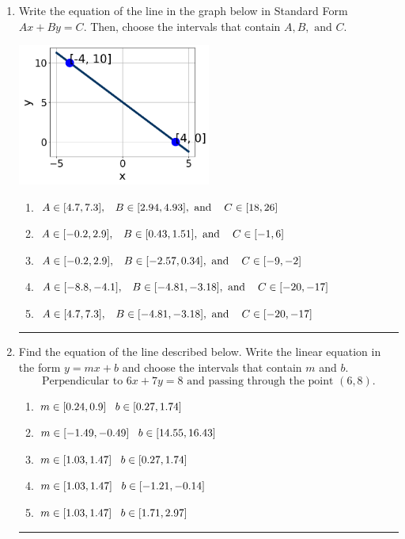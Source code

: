 \documentclass[14pt]{extbook}
\newcommand{\litem}[1]{\item#1\hspace*{-1cm}\rule{\textwidth}{0.4pt}}
\begin{document}
\begin{enumerate}
{\begin{enumerate}[label=\Alph*.]
\end{enumerate} }
\litem{
Write the equation of the line in the graph below in Standard Form $Ax+By=C$. Then, choose the intervals that contain $A, B, \text{ and } C$.
\begin{center}
    \includegraphics[width=0.5\textwidth]{../Figures/linearGraphToStandardCopyB.png}
\end{center}
\begin{enumerate}[label=\Alph*.]
\item \( A \in [4.7, 7.3], \hspace{3mm} B \in [2.94, 4.93], \text{ and } \hspace{3mm} C \in [18, 26] \)
\item \( A \in [-0.2, 2.9], \hspace{3mm} B \in [0.43, 1.51], \text{ and } \hspace{3mm} C \in [-1, 6] \)
\item \( A \in [-0.2, 2.9], \hspace{3mm} B \in [-2.57, 0.34], \text{ and } \hspace{3mm} C \in [-9, -2] \)
\item \( A \in [-8.8, -4.1], \hspace{3mm} B \in [-4.81, -3.18], \text{ and } \hspace{3mm} C \in [-20, -17] \)
\item \( A \in [4.7, 7.3], \hspace{3mm} B \in [-4.81, -3.18], \text{ and } \hspace{3mm} C \in [-20, -17] \)

\end{enumerate} }
\litem{
Find the equation of the line described below. Write the linear equation in the form $ y=mx+b $ and choose the intervals that contain $m$ and $b$.\[ \text{Perpendicular to } 6 x + 7 y = 8 \text{ and passing through the point } (6, 8). \]\begin{enumerate}[label=\Alph*.]
\item \( m \in [0.24, 0.9] \hspace*{3mm} b \in [0.27, 1.74] \)
\item \( m \in [-1.49, -0.49] \hspace*{3mm} b \in [14.55, 16.43] \)
\item \( m \in [1.03, 1.47] \hspace*{3mm} b \in [0.27, 1.74] \)
\item \( m \in [1.03, 1.47] \hspace*{3mm} b \in [-1.21, -0.14] \)
\item \( m \in [1.03, 1.47] \hspace*{3mm} b \in [1.71, 2.97] \)


\end{enumerate}}
\end{enumerate}
\end{document}
